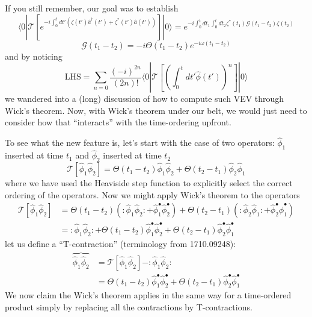 If you still remember, our goal was to establish
\[ \langle 0|\mathcal{T} \left[ e^{-i\int_0^t{dt'\left( \zeta \left( t' \right) \hat{a}^{\dagger}\left( t' \right) +\zeta ^*\left( t' \right) \hat{a}\left( t' \right) \right)}} \right] |0\rangle =e^{-i\int_0^t{dt_1\int_0^t{dt_2\zeta ^*\left( t_1 \right) \mathscr{G} \left( t_1-t_2 \right) \zeta \left( t_2 \right)}}}\]
\[ \mathscr{G} \left( t_1-t_2 \right) =-i\Theta \left( t_1-t_2 \right) e^{-i\omega \left( t_1-t_2 \right)}\]
and by noticing
\[ \mathrm{LHS}=\sum_{n=0}{\frac{\left( -i \right) ^{2n}}{\left( 2n \right) !}\langle 0|\mathcal{T} \left[ \left( \int_0^t{dt'\hat{\phi}\left( t' \right)} \right) ^n \right] |0\rangle}\]
we wandered into a (long) discussion of how to compute such VEV through Wick's theorem. Now, with Wick's theorem under our belt, we would just need to consider how that ``interacts'' with the time-ordering upfront.

To see what the new feature is, let's start with the case of two operators: $\hat{\phi}_1$ inserted at time $t_1$ and $\hat{\phi}_2$ inserted at time $t_2$
\[ \mathcal{T} \left[ \hat{\phi}_1\hat{\phi}_2 \right] =\Theta \left( t_1-t_2 \right) \hat{\phi}_1\hat{\phi}_2+\Theta \left( t_2-t_1 \right) \hat{\phi}_2\hat{\phi}_1\]
where we have used the Heaviside step function to explicitly select the correct ordering of the operators. Now we might apply Wick's theorem to the operators
\begin{align*}
    \mathcal{T} \left[ \hat{\phi}_1\hat{\phi}_2 \right] &=\Theta \left( t_1-t_2 \right) \left( :\hat{\phi}_1\hat{\phi}_2:+\hat{\phi}_{1}^{\bullet}\hat{\phi}_{2}^{\bullet} \right) +\Theta \left( t_2-t_1 \right) \left( :\hat{\phi}_2\hat{\phi}_1:+\hat{\phi}_{2}^{\bullet}\hat{\phi}_{1}^{\bullet} \right) \\
    &=:\hat{\phi}_1\hat{\phi}_2:+\Theta \left( t_1-t_2 \right) \hat{\phi}_{1}^{\bullet}\hat{\phi}_{2}^{\bullet}+\Theta \left( t_2-t_1 \right) \hat{\phi}_{2}^{\bullet}\hat{\phi}_{1}^{\bullet}
\end{align*}
let us define a ``T-contraction'' (terminology from 1710.09248):
\begin{align*}
    \overbrace{\hat{\phi}_1\hat{\phi}_2}&=\mathcal{T} \left[ \hat{\phi}_1\hat{\phi}_2 \right] -:\hat{\phi}_1\hat{\phi}_2:\\
    &=\Theta \left( t_1-t_2 \right) \hat{\phi}_{1}^{\bullet}\hat{\phi}_{2}^{\bullet}+\Theta \left( t_2-t_1 \right) \hat{\phi}_{2}^{\bullet}\hat{\phi}_{1}^{\bullet}
\end{align*}
We now claim the Wick's theorem applies in the same way for a time-ordered product simply by replacing all the contractions by T-contractions.


